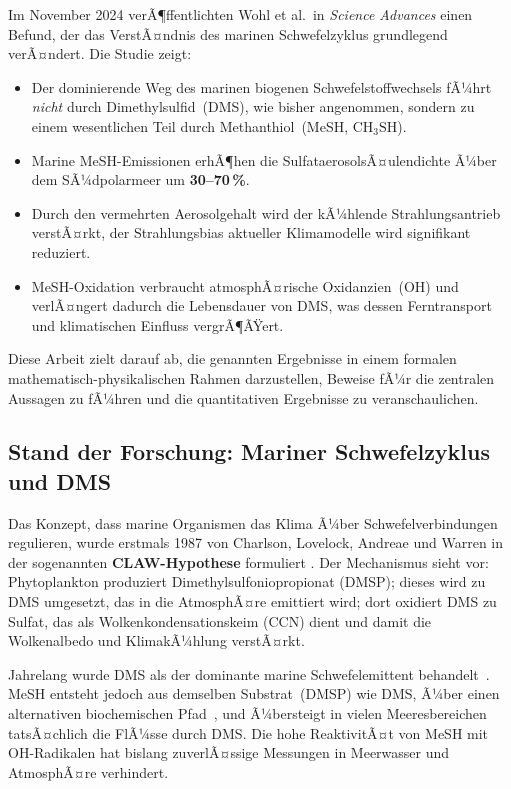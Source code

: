 ﻿\documentclass[a4paper,12pt]{article}
\theoremstyle{definition}
\begin{document}
Im November 2024 verÃ¶ffentlichten Wohl et al.\ in \textit{Science Advances} einen Befund, der das
VerstÃ¤ndnis des marinen Schwefelzyklus grundlegend verÃ¤ndert. Die Studie zeigt:

\begin{itemize}
  \item Der dominierende Weg des marinen biogenen Schwefelstoffwechsels fÃ¼hrt \emph{nicht} durch
        Dimethylsulfid~(DMS), wie bisher angenommen, sondern zu einem wesentlichen Teil durch
        Methanthiol~(MeSH, \(\mathrm{CH_3SH}\)).
  \item Marine MeSH-Emissionen erhÃ¶hen die SulfataerosolsÃ¤ulendichte Ã¼ber dem SÃ¼dpolarmeer um
        \textbf{30--70\,\%}.
  \item Durch den vermehrten Aerosolgehalt wird der kÃ¼hlende Strahlungsantrieb verstÃ¤rkt, der
        Strahlungsbias aktueller Klimamodelle wird signifikant reduziert.
  \item MeSH-Oxidation verbraucht atmosphÃ¤rische Oxidanzien~(OH) und verlÃ¤ngert dadurch die
        Lebensdauer von DMS, was dessen Ferntransport und klimatischen Einfluss vergrÃ¶ÃŸert.
\end{itemize}

Diese Arbeit zielt darauf ab, die genannten Ergebnisse in einem formalen mathematisch-physikalischen
Rahmen darzustellen, Beweise fÃ¼r die zentralen Aussagen zu fÃ¼hren und die quantitativen Ergebnisse
zu veranschaulichen.

\subsection{Stand der Forschung: Mariner Schwefelzyklus und DMS}

Das Konzept, dass marine Organismen das Klima Ã¼ber Schwefelverbindungen regulieren, wurde erstmals
1987 von Charlson, Lovelock, Andreae und Warren in der sogenannten \textbf{CLAW-Hypothese} formuliert
\cite{charlson1987}. Der Mechanismus sieht vor: Phytoplankton produziert Dimethylsulfoniopropionat
(DMSP); dieses wird zu DMS umgesetzt, das in die AtmosphÃ¤re emittiert wird; dort oxidiert DMS zu
Sulfat, das als Wolkenkondensationskeim (CCN) dient und damit die Wolkenalbedo und KlimakÃ¼hlung
verstÃ¤rkt.

Jahrelang wurde DMS als der dominante marine Schwefelemittent behandelt~\cite{lana2011,
andreae2019}. MeSH entsteht jedoch aus demselben Substrat~(DMSP) wie DMS, Ã¼ber einen alternativen
biochemischen Pfad~\cite{kiene1996}, und Ã¼bersteigt in vielen Meeresbereichen tatsÃ¤chlich die
FlÃ¼sse durch DMS. Die hohe ReaktivitÃ¤t von MeSH mit OH-Radikalen hat bislang zuverlÃ¤ssige
Messungen in Meerwasser und AtmosphÃ¤re verhindert.
\end{document}
